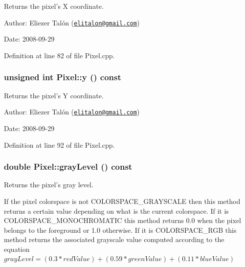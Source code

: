 Returns the pixel's X coordinate. 

\begin{Desc}
\item[Author:]Eliezer Talón (\href{mailto:elitalon@gmail.com}{\tt elitalon@gmail.com}) \end{Desc}
\begin{Desc}
\item[Date:]2008-09-29 \end{Desc}


Definition at line 82 of file Pixel.cpp.\hypertarget{class_pixel_204cc91a99e1e4f1d96c9cf6caf5747a}{
\subsubsection[y]{\setlength{\rightskip}{0pt plus 5cm}unsigned int Pixel::y () const}}
\label{class_pixel_204cc91a99e1e4f1d96c9cf6caf5747a}


Returns the pixel's Y coordinate. 

\begin{Desc}
\item[Author:]Eliezer Talón (\href{mailto:elitalon@gmail.com}{\tt elitalon@gmail.com}) \end{Desc}
\begin{Desc}
\item[Date:]2008-09-29 \end{Desc}


Definition at line 92 of file Pixel.cpp.\hypertarget{class_pixel_6e445cee8bfa4475238823e0b6da42b0}{
\subsubsection[grayLevel]{\setlength{\rightskip}{0pt plus 5cm}double Pixel::grayLevel () const}}
\label{class_pixel_6e445cee8bfa4475238823e0b6da42b0}


Returns the pixel's gray level. 

If the pixel colorspace is not COLORSPACE\_\-GRAYSCALE then this method returns a certain value depending on what is the current colorspace. If it is COLORSPACE\_\-MONOCHROMATIC this method returns 0.0 when the pixel belongs to the foreground or 1.0 otherwise. If it is COLORSPACE\_\-RGB this method returns the associated grayscale value computed according to the equation $grayLevel = (0.3 * redValue) + (0.59 * greenValue) + (0.11 * blueValue)$

